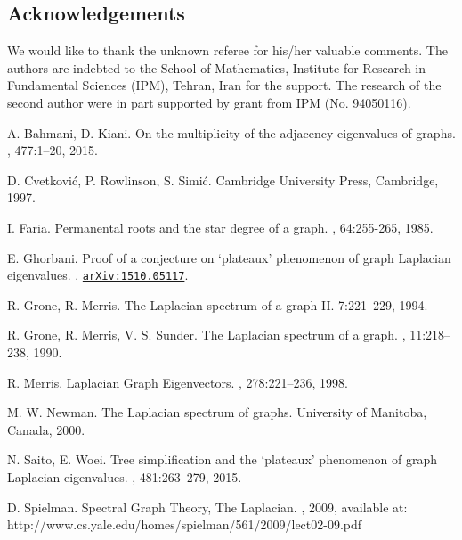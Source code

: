 \documentclass{amsart}
\newcommand{\arxiv}[1]{\href{http://arxiv.org/abs/#1}{\texttt{arXiv:#1}}}
\theoremstyle{remark}
\begin{document}
\subsection*{Acknowledgements}
We would like to thank the unknown referee for his/her valuable comments. The authors are indebted to the School of Mathematics, Institute for Research in Fundamental
Sciences (IPM), Tehran, Iran for the support. The research of the second author were in part supported by grant from IPM (No. 94050116).




\begin{thebibliography}{30}



 A. Bahmani, D. Kiani.  \newblock On the multiplicity of the adjacency eigenvalues of graphs. , 477:1--20, 2015.

 D. Cvetkovi\'{c}, P. Rowlinson, S. Simi\'{c}.   Cambridge University Press, Cambridge, 1997.

 I. Faria. \newblock Permanental roots and the star degree of a graph.  , 64:255-265, 1985.

 E. Ghorbani. \newblock Proof of a conjecture on ‘plateaux’ phenomenon of graph Laplacian eigenvalues. . \arxiv{1510.05117}.

 R. Grone, R. Merris. \newblock  The Laplacian  spectrum of a graph II.   7:221--229, 1994. 

 R. Grone, R. Merris, V. S. Sunder. \newblock  The Laplacian spectrum of a graph.  , 11:218--238, 1990.


  R. Merris.  \newblock Laplacian  Graph Eigenvectors.  , 278:221--236, 1998. 


 M. W. Newman. \newblock  The Laplacian spectrum of graphs.   University of Manitoba, Canada, 2000.


 N. Saito, E. Woei.  \newblock Tree simplification and the ‘plateaux’ phenomenon of graph Laplacian eigenvalues.  , 481:263--279, 2015.

 D. Spielman. \newblock  Spectral Graph Theory, The Laplacian.  , 2009, available at: http://www.cs.yale.edu/homes/spielman/561/2009/lect02-09.pdf

\end{thebibliography}
\end{document}
